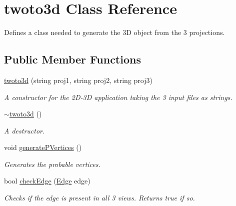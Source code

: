 \hypertarget{classtwoto3d}{}\section{twoto3d Class Reference}
\label{classtwoto3d}


Defines a class needed to generate the 3D object from the 3 projections.  


\subsection*{Public Member Functions}
\begin{DoxyCompactItemize}
\item 
\mbox{\hyperlink{classtwoto3d_a22a5092922477075c8676947551e9476}{twoto3d}} (string proj1, string proj2, string proj3)
\begin{DoxyCompactList}\small\item\em A constructor for the 2\+D-\/3D application taking the 3 input files as strings. \end{DoxyCompactList}\item 
\mbox{\label{classtwoto3d_afeaec5d8c3af0f3d233d687ab3532d9a}} 
\mbox{\hyperlink{classtwoto3d_afeaec5d8c3af0f3d233d687ab3532d9a}{$\sim$twoto3d}} ()
\begin{DoxyCompactList}\small\item\em A destructor. \end{DoxyCompactList}\item 
void \mbox{\hyperlink{classtwoto3d_a7b7f3f38be16773db7b155f0be8fce6b}{generate\+P\+Vertices}} ()
\begin{DoxyCompactList}\small\item\em Generates the probable vertices. \end{DoxyCompactList}\item 
bool \mbox{\hyperlink{classtwoto3d_a7fdf12ceaffa00e9c0181ae1bcf30614}{check\+Edge}} (\mbox{\hyperlink{struct_edge}{Edge}} edge)
\begin{DoxyCompactList}\small\item\em Checks if the edge is present in all 3 views. Returns true if so. \end{DoxyCompactList}\end{DoxyCompactItemize}

